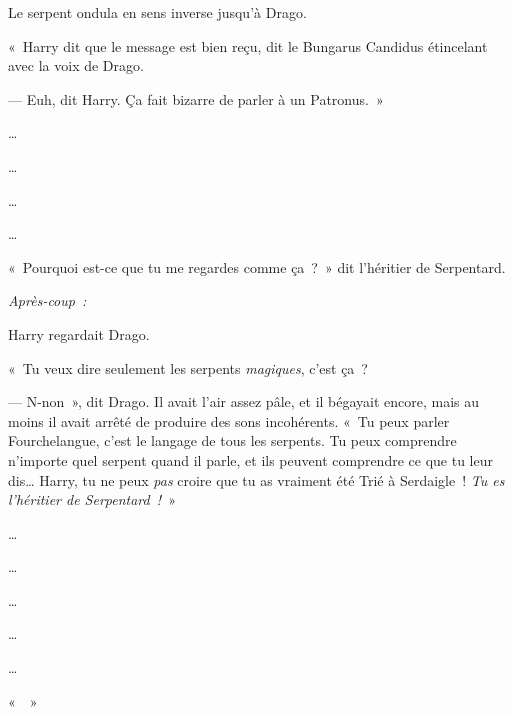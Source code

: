 Le serpent ondula en sens inverse jusqu'à Drago.

«~Harry dit que le message est bien reçu, dit le Bungarus Candidus étincelant avec la voix de Drago.

--- Euh, dit Harry.
Ça fait bizarre de parler à un Patronus.~»

…

…

…

…

«~Pourquoi est-ce que tu me regardes comme ça~?~»
dit l'héritier de Serpentard.

\later

\emph{Après-coup~:}

Harry regardait Drago.

«~Tu veux dire seulement les serpents \emph{magiques}, c'est ça~?

--- N-non~», dit Drago.
Il avait l'air assez pâle, et il bégayait encore, mais au moins il avait arrêté de produire des sons incohérents.
«~Tu peux parler Fourchelangue, c'est le langage de tous les serpents.
Tu peux comprendre n'importe quel serpent quand il parle, et ils peuvent comprendre ce que tu leur dis…
Harry, tu ne peux \emph{pas} croire que tu as vraiment été Trié à Serdaigle~!
\emph{Tu es l'héritier de Serpentard~!}~»

…

…

…

…

…

«~~»
